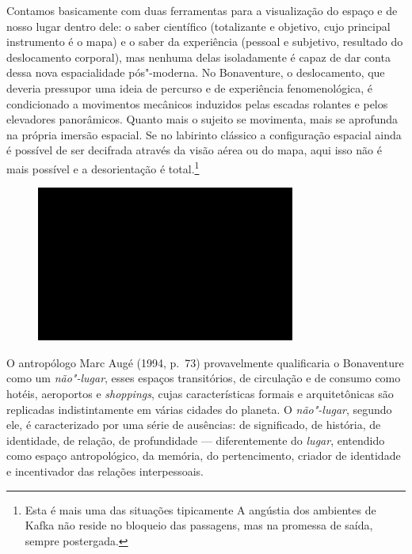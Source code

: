 Contamos basicamente com duas ferramentas para a visualização do espaço
e de nosso lugar dentro dele: o saber científico (totalizante e
objetivo, cujo principal instrumento é o mapa) e o saber da experiência
(pessoal e subjetivo, resultado do deslocamento corporal), mas nenhuma
delas isoladamente é capaz de dar conta dessa nova espacialidade
pós"-moderna. No Bonaventure, o deslocamento, que deveria pressupor uma
ideia de percurso e de experiência fenomenológica, é condicionado a
movimentos mecânicos induzidos pelas escadas rolantes e pelos elevadores
panorâmicos. Quanto mais o sujeito se movimenta, mais se aprofunda na
própria imersão espacial. Se no labirinto clássico a configuração
espacial ainda é possível de ser decifrada através da visão aérea ou do
mapa, aqui isso não é mais possível e a desorientação é total.\footnote{Esta
  é mais uma das situações tipicamente {} A angústia dos
  ambientes de Kafka não reside no bloqueio das passagens, mas na
  promessa de saída, sempre postergada.}

\begin{figure}[!ht]
\centering
 \includegraphics[width=85mm]{./imgs/im1.jpg}
\caption{\tiny{}}
\end{figure}

O antropólogo Marc Augé (1994, p.~73) provavelmente qualificaria o
Bonaventure como um \emph{não"-lugar}, esses espaços transitórios, de
circulação e de consumo como hotéis, aeroportos e \emph{shoppings},
cujas características formais e arquitetônicas são replicadas
indistintamente em várias cidades do planeta. O \emph{não"-lugar},
segundo ele, é caracterizado por uma série de ausências: de significado,
de história, de identidade, de relação, de profundidade ---
diferentemente do \emph{lugar}, entendido como espaço antropológico, da
memória, do pertencimento, criador de identidade e incentivador das
relações interpessoais.

